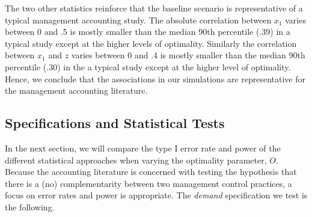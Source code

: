 \documentclass[12pt]{article}
\begin{document}
The two other statistics reinforce that the baseline scenario is representative of a typical management accounting study. The absolute correlation between $x_1$ varies between 0 and .5 is mostly smaller than the median 90th percentile ($.39$) in a typical study except at the higher levels of optimality. Similarly the correlation between $x_1$ and $z$ varies between 0 and .4 is mostly smaller than the median 90th percentile (.30) in the a typical study except at the higher level of optimality. Hence, we conclude that the associations in our simulations are representative for the management accounting literature. 

\subsection{Specifications and Statistical Tests}
In the next section, we will compare the type I error rate and power of the different statistical approaches when varying the optimality parameter, \(O\). Because the accounting literature is concerned with testing the hypothesis that there is a (no) complementarity between two management control practices, a focus on error rates and power is appropriate. The \emph{demand} specification we test is the following.
\end{document}
